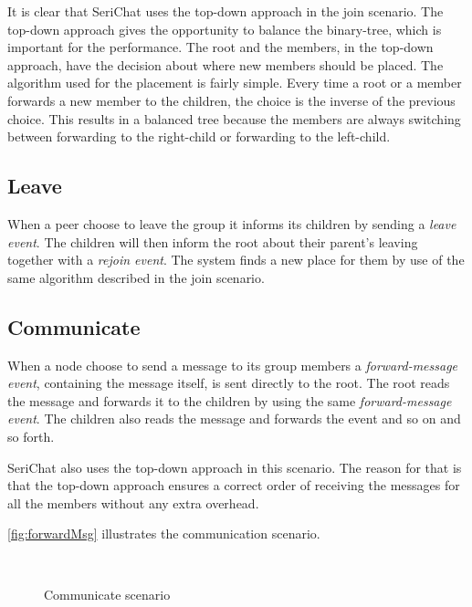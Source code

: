 It is clear that SeriChat uses the top-down approach in the join scenario. The top-down approach gives the opportunity to balance the binary-tree, which is important for the performance. The root and the members, in the top-down approach, have the decision about where new members should be placed. The algorithm used for the placement is fairly simple. Every time a root or a member forwards a new member to the children, the choice is the inverse of the previous choice. This results in a balanced tree because the members are always switching between forwarding to the right-child or forwarding to the left-child. 

\subsection{Leave}
When a peer choose to leave the group it informs its children by sending a \emph{leave event}. The children will then inform the root about their parent's leaving together with a \emph{rejoin event}. The system finds a new place for them by use of the same algorithm described in the join scenario.

\subsection{Communicate}
When a node choose to send a message to its group members a \emph{forward-message event}, containing the message itself,  is sent directly to the root. The root reads the message and forwards it to the children by using the same \emph{forward-message event}. The children also reads the message and forwards the event and so on and so forth.

SeriChat also uses the top-down approach in this scenario. The reason for that is that the top-down approach ensures a correct order of receiving the messages for all the members without any extra overhead.

\autoref{fig:forwardMsg} illustrates the communication scenario.
\begin{figure}[bth]
	\myfloatalign
	 \quad
	 \\
	\caption{Communicate scenario}\label{fig:forwardMsg}
\end{figure}

